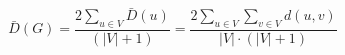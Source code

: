 \documentclass[12pt]{article}
\begin{document}
\[
\bar{D}\left(G\right)
    = \frac
        {2\displaystyle\sum_{u \in V}{\bar{D}\left(u\right)}}
        {\left(\left|V\right|+1\right)}
    = \frac
        {2\displaystyle\sum_{u \in V}\sum_{v \in V}{d\left(u,v\right)}}
        {\left|V\right| \cdot \left(\left|V\right|+1\right)}
\]
\end{document}
